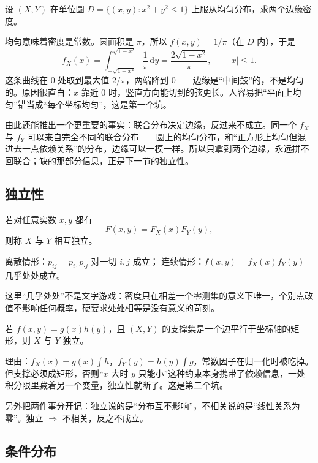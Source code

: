 \begin{example}[圆上的均匀分布]
设 $(X,Y)$ 在单位圆 $D=\{(x,y):x^2+y^2\le 1\}$ 上服从均匀分布，求两个边缘密度。
\end{example}

均匀意味着密度是常数。圆面积是 $\pi$，所以 $f(x,y)=1/\pi$（在 $D$ 内），于是
\[
f_X(x)=\int_{-\sqrt{1-x^2}}^{\sqrt{1-x^2}}\frac{1}{\pi}\,\mathrm{d}y
=\frac{2\sqrt{1-x^2}}{\pi},\qquad |x|\le 1 .
\]
这条曲线在 $0$ 处取到最大值 $2/\pi$，两端降到 $0$——边缘是“中间鼓”的，不是均匀的。原因很直白：$x$ 靠近 $0$ 时，竖直方向能切到的弦更长。人容易把“平面上均匀”错当成“每个坐标均匀”，这是第一个坑。

由此还能推出一个更重要的事实：联合分布决定边缘，反过来不成立。同一个 $f_X$ 与 $f_Y$ 可以来自完全不同的联合分布——圆上的均匀分布，和“正方形上均匀但混进去一点依赖关系”的分布，边缘可以一模一样。所以只拿到两个边缘，永远拼不回联合；缺的那部分信息，正是下一节的独立性。

\subsection{独立性}

\begin{definition}[独立性]
若对任意实数 $x,y$ 都有
\[
F(x,y)=F_X(x)F_Y(y),
\]
则称 $X$ 与 $Y$ 相互独立。
\end{definition}

\begin{proposition}[独立的等价刻画]
离散情形：$p_{ij}=p_{i\cdot}p_{\cdot j}$ 对一切 $i,j$ 成立；
连续情形：$f(x,y)=f_X(x)f_Y(y)$ 几乎处处成立。
\end{proposition}

这里“几乎处处”不是文字游戏：密度只在相差一个零测集的意义下唯一，个别点改值不影响任何概率，硬要求处处相等是没有意义的苛刻。

\begin{proposition}[可分离密度的判据]
若 $f(x,y)=g(x)h(y)$，且 $(X,Y)$ 的支撑集是一个边平行于坐标轴的矩形，则 $X$ 与 $Y$ 独立。
\end{proposition}

理由：$f_X(x)=g(x)\int h$，$f_Y(y)=h(y)\int g$，常数因子在归一化时被吃掉。但支撑必须成矩形，否则“$x$ 大时 $y$ 只能小”这种约束本身携带了依赖信息，一处积分限里藏着另一个变量，独立性就断了。这是第二个坑。

另外把两件事分开记：独立说的是“分布互不影响”，不相关说的是“线性关系为零”。独立 $\Rightarrow$ 不相关，反之不成立。

\subsection{条件分布}

